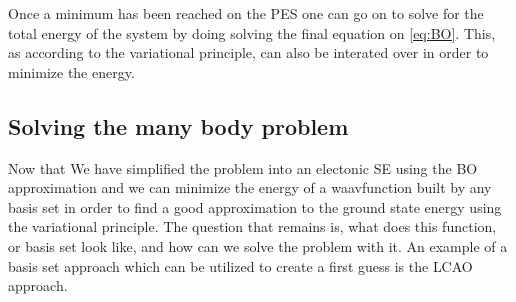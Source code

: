 \documentclass[../master_thesis.tex]{subfiles}
\begin{document}
Once a minimum has been reached on the \ac{PES} one can go on to solve for the
total energy of the system by doing solving the final equation on \ref{eq:BO}.
This, as according to the variational principle, can also be interated over in
order to minimize the energy.

\subsection{Solving the many body problem}

Now that We have simplified the problem into an electonic \ac{SE} using the
\ac{BO} approximation and we can minimize the energy of a waavfunction built
by any basis set in order to find a good approximation to the ground state
energy using the variational principle. The question that remains is, what does
this function, or basis set look like, and how can we solve the problem with it.
An example of a basis set approach which can be utilized to create a first guess
is the \ac{LCAO} approach.











\biblio
\end{document}
